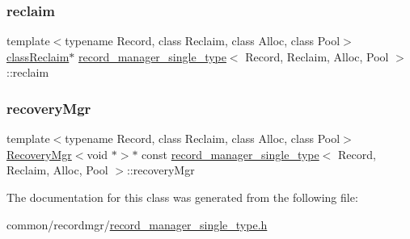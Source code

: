 \subsubsection{\texorpdfstring{reclaim}{reclaim}}
{\footnotesize\ttfamily template$<$typename Record, class Reclaim, class Alloc, class Pool$>$ \\
\hyperlink{classrecord__manager__single__type_a831ae4c91e0ba85f07fd6b68ef18f035}{class\+Reclaim}$\ast$ \hyperlink{classrecord__manager__single__type}{record\+\_\+manager\+\_\+single\+\_\+type}$<$ Record, Reclaim, Alloc, Pool $>$\+::reclaim}

\mbox{\label{classrecord__manager__single__type_aac9343d6515d6d32a71f541aeb098376}} 
\subsubsection{\texorpdfstring{recovery\+Mgr}{recoveryMgr}}
{\footnotesize\ttfamily template$<$typename Record, class Reclaim, class Alloc, class Pool$>$ \\
\hyperlink{classRecoveryMgr}{Recovery\+Mgr}$<$void $\ast$$>$$\ast$ const \hyperlink{classrecord__manager__single__type}{record\+\_\+manager\+\_\+single\+\_\+type}$<$ Record, Reclaim, Alloc, Pool $>$\+::recovery\+Mgr}



The documentation for this class was generated from the following file\+:\begin{DoxyCompactItemize}
\item 
common/recordmgr/\hyperlink{record__manager__single__type_8h}{record\+\_\+manager\+\_\+single\+\_\+type.\+h}\end{DoxyCompactItemize}
